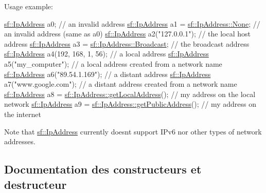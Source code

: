 Usage example\+: 
\begin{DoxyCode}
\hyperlink{classsf_1_1IpAddress}{sf::IpAddress} a0;                                     \textcolor{comment}{// an invalid address}
\hyperlink{classsf_1_1IpAddress}{sf::IpAddress} a1 = \hyperlink{classsf_1_1IpAddress_a4619b4abbe3c8fef056e7299db967404}{sf::IpAddress::None};               \textcolor{comment}{// an invalid address
       (same as a0)}
\hyperlink{classsf_1_1IpAddress}{sf::IpAddress} a2(\textcolor{stringliteral}{"127.0.0.1"});                        \textcolor{comment}{// the local host address}
\hyperlink{classsf_1_1IpAddress}{sf::IpAddress} a3 = \hyperlink{classsf_1_1IpAddress_aa93d1d57b65d243f2baf804b6035465c}{sf::IpAddress::Broadcast};          \textcolor{comment}{// the broadcast
       address}
\hyperlink{classsf_1_1IpAddress}{sf::IpAddress} a4(192, 168, 1, 56);                    \textcolor{comment}{// a local address}
\hyperlink{classsf_1_1IpAddress}{sf::IpAddress} a5(\textcolor{stringliteral}{"my\_computer"});                      \textcolor{comment}{// a local address created from a
       network name}
\hyperlink{classsf_1_1IpAddress}{sf::IpAddress} a6(\textcolor{stringliteral}{"89.54.1.169"});                      \textcolor{comment}{// a distant address}
\hyperlink{classsf_1_1IpAddress}{sf::IpAddress} a7(\textcolor{stringliteral}{"www.google.com"});                   \textcolor{comment}{// a distant address created from a
       network name}
\hyperlink{classsf_1_1IpAddress}{sf::IpAddress} a8 = \hyperlink{classsf_1_1IpAddress_a4c31622ad87edca48adbb8e8ed00ee4a}{sf::IpAddress::getLocalAddress}();  \textcolor{comment}{// my
       address on the local network}
\hyperlink{classsf_1_1IpAddress}{sf::IpAddress} a9 = \hyperlink{classsf_1_1IpAddress_a5c5cbf67e4aacf23c24f2ad991df4c55}{sf::IpAddress::getPublicAddress}(); \textcolor{comment}{// my
       address on the internet}
\end{DoxyCode}


Note that \hyperlink{classsf_1_1IpAddress}{sf\+::\+Ip\+Address} currently doesn\textquotesingle{}t support I\+Pv6 nor other types of network addresses. 

\subsection{Documentation des constructeurs et destructeur}
\mbox{\label{classsf_1_1IpAddress_af32a0574baa0f46e48deb2d83ca7658b}} 
